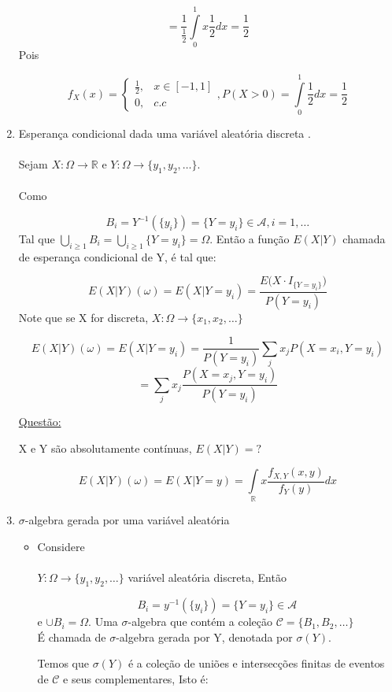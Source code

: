 \documentclass[a4paper,12pt]{article}
\begin{document}
\begin{enumerate}[label=\roman*)]
$$= \frac{1}{\frac{1}{2}} \int\limits_0^1 x \frac{1}{2} dx =\frac{1}{2}$$
Pois

$$f_X(x) = \begin{cases}
\frac{1}{2}, & x \in [-1,1]\\
0, & c.c
\end{cases},
P(X>0) = \int\limits_0^1 \frac{1}{2}dx = \frac{1}{2}
 $$
 
 \item Esperança condicional dada uma variável aleatória discreta .\\
 \\
 Sejam $X:\Omega \longrightarrow \mathbb R $ e $Y:\Omega \longrightarrow \{y_1,y_2,\ldots\} $.\\
\\
Como

$$B_i = Y^{-1}(\{y_i\}) = \{Y=y_i\} \in \mathscr A, i=1,\ldots $$
Tal que $\bigcup_{i\ge 1}B_i = \bigcup\limits_{i\ge 1} \{Y=y_i\}=\Omega$. Então a função $E(X|Y)$ chamada de esperança condicional de Y, é tal que:

$$E(X|Y)(\omega) = E(X|Y=y_i)  = \frac{E\bigg( X\cdot I_{\{Y=y_i\}}\bigg)}{P(Y=y_i)}$$
Note que se X for discreta, $X:\Omega \longrightarrow \{x_1,x_2,\ldots \}$

$$E(X|Y)(\omega) = E(X|Y=y_i) = \frac{1}{P(Y=y_i)}\sum\limits_j x_j P(X=x_i,Y=y_i) $$
$$= \sum\limits_j x_j \frac{P(X=x_j,Y=y_i)}{P(Y=y_i)} $$

\underline{Questão:}

X e Y são absolutamente contínuas, $E(X|Y)=?$

$$E(X|Y)(\omega) = E(X|Y=y)= \int\limits_{\mathbb R} x \frac{f_{X,Y}(x,y)}{f_Y(y)}dx $$

\item $\sigma$-algebra gerada por uma variável aleatória

\begin{itemize}
	\item Considere\\
	\\
	$Y:\Omega \longrightarrow \{y_1,y_2,\ldots\}$ variável aleatória discreta, 
	Então
	
	$$B_i = y^{-1}(\{y_i\})= \{Y=y_i\} \in \mathscr A $$
	 e $\cup B_i=\Omega$. Uma $\sigma$-algebra que contém a coleção $\mathscr C =\{B_1,B_2,\ldots\}$\\
	É chamada de $\sigma$-algebra gerada por Y, denotada por $\sigma(Y)$.
	
	Temos que $\sigma(Y)$ é a coleção de uniões e intersecções finitas de eventos de $\mathscr C$ e seus complementares, Isto é:
	

\end{itemize}
\end{enumerate}
\end{document}
